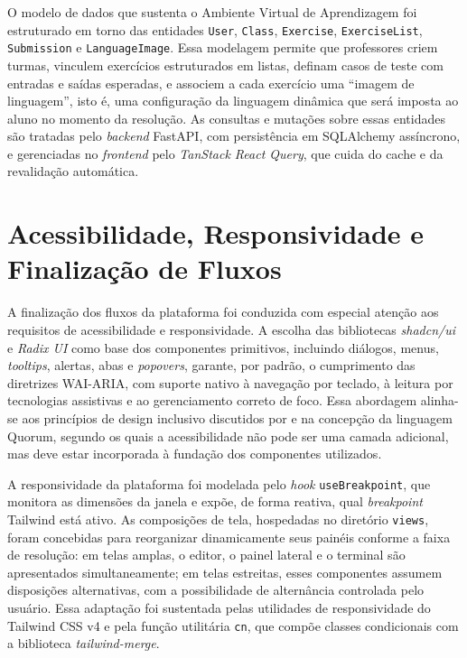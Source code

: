 O modelo de dados que sustenta o Ambiente Virtual de Aprendizagem foi estruturado em torno das entidades \texttt{User}, \texttt{Class}, \texttt{Exercise}, \texttt{ExerciseList}, \texttt{Submission} e \texttt{LanguageImage}. Essa modelagem permite que professores criem turmas, vinculem exercícios estruturados em listas, definam casos de teste com entradas e saídas esperadas, e associem a cada exercício uma ``imagem de linguagem'', isto é, uma configuração da linguagem dinâmica que será imposta ao aluno no momento da resolução. As consultas e mutações sobre essas entidades são tratadas pelo \textit{backend} FastAPI, com persistência em SQLAlchemy assíncrono, e gerenciadas no \textit{frontend} pelo \textit{TanStack React Query}, que cuida do cache e da revalidação automática.

\section{Acessibilidade, Responsividade e Finalização de Fluxos}
\label{sec:acessibilidade-responsividade}

A finalização dos fluxos da plataforma foi conduzida com especial atenção aos requisitos de acessibilidade e responsividade. A escolha das bibliotecas \textit{shadcn/ui} e \textit{Radix UI} como base dos componentes primitivos, incluindo diálogos, menus, \textit{tooltips}, alertas, abas e \textit{popovers}, garante, por padrão, o cumprimento das diretrizes WAI-ARIA, com suporte nativo à navegação por teclado, à leitura por tecnologias assistivas e ao gerenciamento correto de foco. Essa abordagem alinha-se aos princípios de design inclusivo discutidos por  e  na concepção da linguagem Quorum, segundo os quais a acessibilidade não pode ser uma camada adicional, mas deve estar incorporada à fundação dos componentes utilizados.

A responsividade da plataforma foi modelada pelo \textit{hook} \texttt{useBreakpoint}, que monitora as dimensões da janela e expõe, de forma reativa, qual \textit{breakpoint} Tailwind está ativo. As composições de tela, hospedadas no diretório \texttt{views}, foram concebidas para reorganizar dinamicamente seus painéis conforme a faixa de resolução: em telas amplas, o editor, o painel lateral e o terminal são apresentados simultaneamente; em telas estreitas, esses componentes assumem disposições alternativas, com a possibilidade de alternância controlada pelo usuário. Essa adaptação foi sustentada pelas utilidades de responsividade do Tailwind CSS v4 e pela função utilitária \texttt{cn}, que compõe classes condicionais com a biblioteca \textit{tailwind-merge}.

